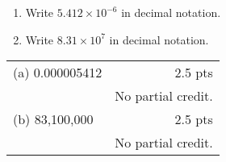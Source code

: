 

{
	\begin{enumerate}
	\item Write $5.412\times 10^{-6}$ in decimal notation.
	\begin{onlyproblem}\spc\end{onlyproblem}
	\item Write $8.31\times 10^{7}$ in decimal notation.
	\end{enumerate}
}
{
	\begin{tabular}{l r}
	(a) 0.000005412&  2.5 pts\\
	& No partial credit.\\
	(b) 83,100,000 & 2.5 pts\\
	& No partial credit.
	\end{tabular}
}
